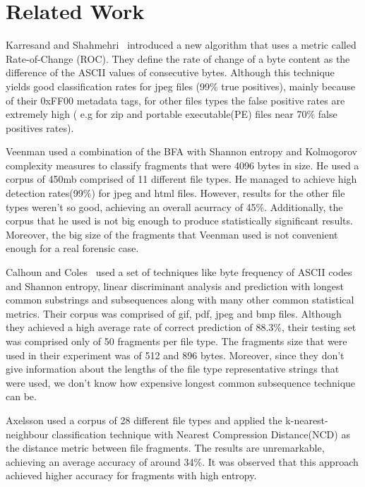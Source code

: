 \chapter{Related Work}


Karresand and Shahmehri~\cite{roc} introduced a new algorithm that uses a metric called Rate-of-Change (ROC). They define the rate of change of a byte content as the difference of the ASCII values of consecutive bytes. Although this technique yields good classification rates for jpeg files (99\% true positives), mainly because of their 0xFF00 metadata tags, for other files types the false positive rates are extremely high ( e.g for zip and portable executable(PE) files near 70\% false positives rates).

Veenman\cite{Veenman} used a combination of the BFA\cite{MacDaniel} with Shannon entropy and Kolmogorov complexity measures to classify fragments that were 4096 bytes in size. He used a corpus of 450mb comprised of 11 different file types. He managed to achieve high detection rates(99\%) for jpeg and html files. However, results for the other file types weren't so good, achieving an overall acurracy of 45\%. Additionally, the corpus that he used is not big enough to produce statistically significant results. Moreover, the big size of the fragments that Veenman used is not convenient enough for a real forensic case.

Calhoun  and Coles~\cite{Calhoun} used a set of techniques like byte frequency of ASCII codes and Shannon entropy, linear discriminant analysis and prediction with longest common substrings and subsequences along with many other common statistical metrics. Their corpus was comprised of gif, pdf, jpeg and bmp files.
Although they achieved a high average rate of correct prediction of 88.3\%, their testing set was comprised only of 50 fragments per file type. The fragments size that were used in their experiment was of 512 and 896 bytes. Moreover, since they don't give information about the lengths of the file type representative strings  that were used, we don't know how expensive longest common subsequence technique can be. 

Axelsson\cite{Axelsson} used a corpus of 28 different file types and applied the k-nearest-neighbour classification technique with Nearest Compression Distance(NCD) as the distance metric between file fragments. The results are unremarkable, achieving an average accuracy of around 34\%. It was observed that this approach achieved higher accuracy for fragments with high entropy.

